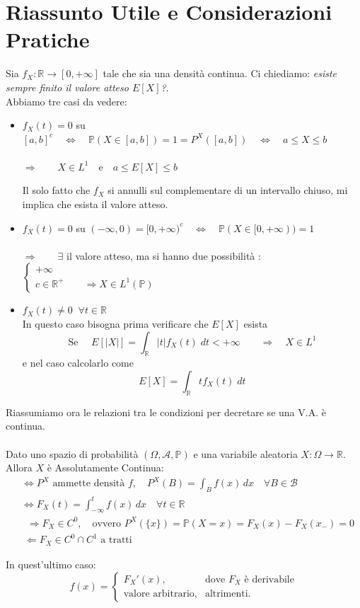 \section{Riassunto Utile e Considerazioni Pratiche}
Sia  $f_X:\mathbb{R}\to [0, +\infty]$ tale che sia una densità continua. Ci chiediamo: \textit{esiste sempre finito il valore atteso $E[X]$?}.\\
Abbiamo tre casi da vedere:
\begin{itemize}
    \item[\(\bigstar\)] $f_X(t) = 0$ su $[a, b]^c \quad  \iff \quad \mathbb{P}(X\in[a, b]) = 1 = P^X([a, b]) \quad  \iff \quad a\leq X\leq b$\\
    \\
    $\Rightarrow \qquad X\in L^1\quad \text{e}\quad a\leq E[X] \leq b$
    
    \medskip
    \noindent Il solo fatto che $f_X$ si annulli sul complementare di un intervallo chiuso, mi implica che esista il valore atteso.
    \item[\(\bigstar\)] $f_X(t) = 0$ su $(-\infty, 0) = [0, +\infty)^c \quad  \iff \quad \mathbb{P}(X\in[0, +\infty)) = 1$\\
    \\
    $\Rightarrow \qquad \exists$ il valore atteso, ma si hanno due possibilità :\quad $\begin{cases}
        +\infty\\
        c\in\mathbb{R}^+\qquad \Rightarrow X\in L^1(\mathbb{P})
    \end{cases}$
    \item[\(\bigstar\)] $f_X(t) \neq0\;\;\forall t\in\mathbb{R}$\\
    In questo caso bisogna prima verificare che $E[X]$ esista\\
    \[\text{Se }\quad E[|X|] = \int_\mathbb{R}|t|f_X(t)\;dt<+\infty \qquad \Rightarrow\quad X\in L^1\]
    e nel caso calcolarlo come
    \[E[X] = \int_\mathbb{R}tf_X(t)\;dt\]
\end{itemize}

\bigskip
\noindent Riassumiamo ora le relazioni tra le condizioni per decretare se una V.A. è continua.\\
\\
Dato uno spazio di probabilità $(\Omega, \mathcal{A}, \mathbb{P})$ e una variabile aleatoria $X : \Omega \to \mathbb{R}$.\\
Allora $X$ è Assolutamente Continua:
\begin{align*}
    & \iff P^X \text{ ammette densità } f, \quad P^X(B) = \int_B f(x)\,dx \quad \forall B \in \mathcal{B}\\
    & \iff F_X(t) = \int_{-\infty}^{t} f(x)\,dx \quad \forall t \in \mathbb{R}\\
    & \;\;\Longrightarrow F_X \in C^0, \quad \text{ovvero } P^X(\{x\}) = 
    \mathbb{P}(X = x) = F_X(x) - F_X(x_-) = 0 \\
    & \;\Longleftarrow F_X \in C^0 \cap C^1 \text{ a tratti}
\end{align*}

In quest’ultimo caso:
\[
f(x) =
\begin{cases}
F_X'(x), & \text{dove } F_X \text{ è derivabile} \\
\text{valore arbitrario}, & \text{altrimenti.}
\end{cases}
\]



